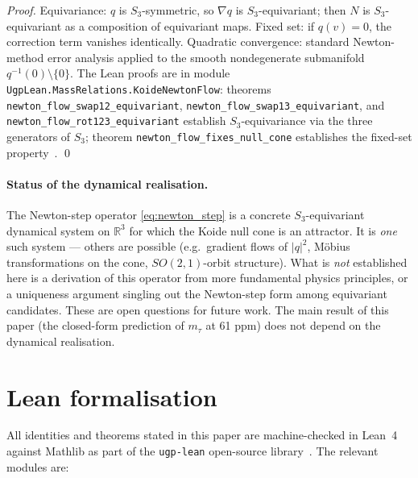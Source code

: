 \documentclass[11pt]{article}
\theoremstyle{remark}
\begin{document}
\noindent \emph{Proof.} Equivariance: $q$ is $S_3$-symmetric, so $\nabla q$ is $S_3$-equivariant; then $N$ is $S_3$-equivariant as a composition of equivariant maps. Fixed set: if $q(v) = 0$, the correction term vanishes identically.  Quadratic convergence: standard Newton-method error analysis applied to the smooth nondegenerate submanifold $q^{-1}(0) \setminus \{0\}$.  The Lean proofs are in module \nolinkurl{UgpLean.MassRelations.KoideNewtonFlow}: theorems \nolinkurl{newton_flow_swap12_equivariant}, \nolinkurl{newton_flow_swap13_equivariant}, and \nolinkurl{newton_flow_rot123_equivariant} establish $S_3$-equivariance via the three generators of $S_3$; theorem \nolinkurl{newton_flow_fixes_null_cone} establishes the fixed-set property~\cite{ugp-lean}. \qed

\paragraph{Status of the dynamical realisation.}
The Newton-step operator \eqref{eq:newton_step} is a concrete $S_3$-equivariant dynamical system on $\mathbb{R}^3$ for which the Koide null cone is an attractor.  It is \emph{one} such system --- others are possible (e.g.\ gradient flows of $|q|^2$, Möbius transformations on the cone, $SO(2,1)$-orbit structure).  What is \emph{not} established here is a derivation of this operator from more fundamental physics principles, or a uniqueness argument singling out the Newton-step form among equivariant candidates.  These are open questions for future work.  The main result of this paper (the closed-form prediction of $m_\tau$ at 61 ppm) does not depend on the dynamical realisation.

\section{Lean formalisation}
\label{sec:lean}

All identities and theorems stated in this paper are machine-checked in Lean~4 against Mathlib as part of the \texttt{ugp-lean} open-source library~\cite{ugp-lean}.  The relevant modules are:
\end{document}

